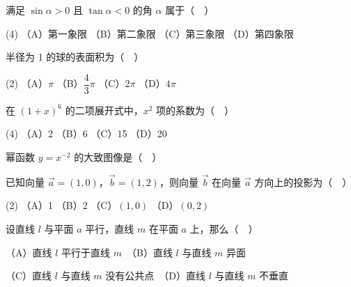 \begin{question}
满足 \(\sin\alpha>0\) 且 \(\tan\alpha<0\) 的角 \(\alpha\) 属于（　）

\begin{gkopts}(4)
\task （A）第一象限
\task （B）第二象限
\task （C）第三象限
\task （D）第四象限
\end{gkopts}

\end{question}
\begin{question}
半径为 1 的球的表面积为（　）

\begin{gkopts}(2)
\task （A）\(\pi\)
\task （B）\(\dfrac{4}{3}\pi\)
\task （C）\(2\pi\)
\task （D）\(4\pi\)
\end{gkopts}

\end{question}
\begin{question}
在 \((1+x)^{6}\) 的二项展开式中，\(x^{2}\) 项的系数为（　）

\begin{gkopts}(4)
\task （A）2
\task （B）6
\task （C）15
\task （D）20
\end{gkopts}

\Needspace{0.4\textheight}
\end{question}
\begin{question}
幂函数 \(y=x^{-2}\) 的大致图像是（　）
\nopagebreak[4]
\begin{center}\end{center}
\nopagebreak[4]
\end{question}
\begin{question}
已知向量 \(\vec{a}=(1,0)\)，\(\vec{b}=(1,2)\)，则向量 \(\vec{b}\) 在向量 \(\vec{a}\) 方向上的投影为（　）

\begin{gkopts}(2)
\task （A）1
\task （B）2
\task （C）\((1,0)\)
\task （D）\((0,2)\)
\end{gkopts}

\end{question}
\begin{question}
设直线 \(l\) 与平面 \(a\) 平行，直线 \(m\) 在平面 \(a\) 上，那么（　）

（A）直线 \(l\) 平行于直线 \(m\)　（B）直线 \(l\) 与直线 \(m\) 异面

（C）直线 \(l\) 与直线 \(m\) 没有公共点　（D）直线 \(l\) 与直线 \(m\) 不垂直

\end{question}
